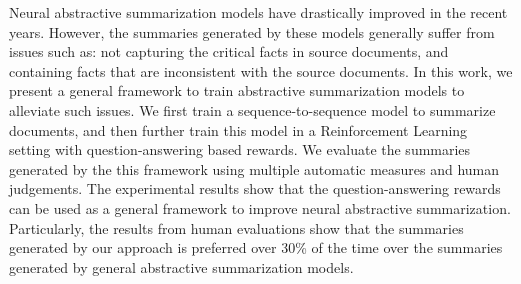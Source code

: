 Neural abstractive summarization models have drastically improved in the recent years. However, the summaries generated by these models generally suffer from issues such as: not capturing the critical facts in source documents, and containing facts that are inconsistent with the source documents. In this work, we present a general framework to train abstractive summarization models to alleviate such issues. We first train a sequence-to-sequence model to summarize documents, and then further train this model in a Reinforcement Learning setting with question-answering based rewards. We evaluate the summaries generated by the this framework using multiple automatic measures and human judgements. The experimental results show that the question-answering rewards can be used as a general framework to improve neural abstractive summarization. Particularly, the results from human evaluations show that the summaries generated by our approach is preferred over 30\% of the time over the summaries generated by general abstractive summarization models.
